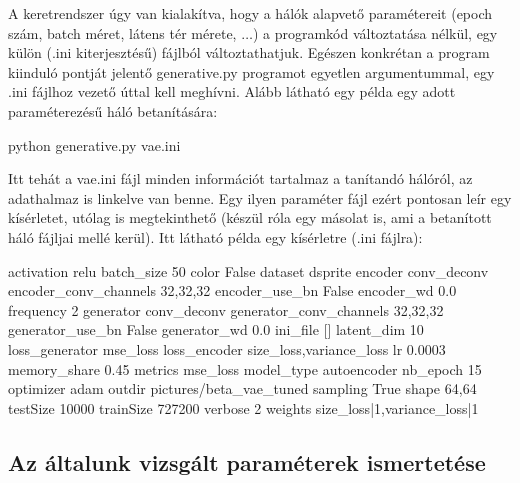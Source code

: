 A keretrendszer úgy van kialakítva, hogy a hálók alapvető paramétereit (epoch szám, batch méret, látens tér mérete, $\dots$) a programkód változtatása nélkül, egy külön (.ini kiterjesztésű) fájlból változtathatjuk. Egészen konkrétan a program kiinduló pontját jelentő generative.py programot egyetlen argumentummal, egy .ini fájlhoz vezető úttal kell meghívni. Alább látható egy példa egy adott paraméterezésű háló betanítására:


\lstset{language=sh}
\begin{python}
python generative.py vae.ini
\end{python}

Itt tehát a vae.ini fájl minden információt tartalmaz a tanítandó hálóról, az adathalmaz is linkelve van benne. Egy ilyen paraméter fájl ezért pontosan leír egy kísérletet, utólag is megtekinthető (készül róla egy másolat is, ami a betanított háló fájljai mellé kerül). Itt látható példa egy kísérletre (.ini fájlra):

\begin{python}
activation	relu
batch_size	50
color	False
dataset	dsprite
encoder	conv_deconv
encoder_conv_channels   32,32,32
encoder_use_bn	False
encoder_wd	0.0
frequency	2
generator	conv_deconv
generator_conv_channels   32,32,32
generator_use_bn	False
generator_wd	0.0
ini_file	[]
latent_dim	10
loss_generator  mse_loss
loss_encoder    size_loss,variance_loss
lr	0.0003
memory_share	0.45
metrics	mse_loss
model_type	autoencoder
nb_epoch	15
optimizer	adam
outdir	pictures/beta_vae_tuned
sampling	True
shape	64,64
testSize	10000
trainSize	727200
verbose	2
weights size_loss|1,variance_loss|1
\end{python}

\subsection{Az általunk vizsgált paraméterek ismertetése}

